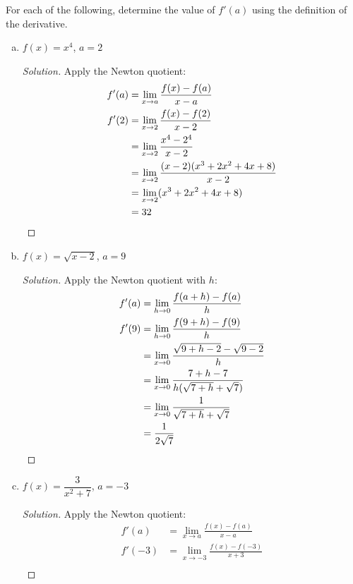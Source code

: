 \documentclass{agony}
\begin{document}
\question For each of the following, determine the value of $f'(a)$ using the definition of the derivative.
\begin{enumerate}[(a)]
  \item $f(x) = x^4$, $a=2$
        \begin{proof}[Solution]
          Apply the Newton quotient:
          \begin{align*}
            f'(a) & = \lim_{x\to a}\frac{f(x)-f(a)}{x-a}            \\
            f'(2) & = \lim_{x\to 2}\frac{f(x)-f(2)}{x-2}            \\
                  & = \lim_{x\to 2}\frac{x^4-2^4}{x-2}              \\
                  & = \lim_{x\to 2}\frac{(x-2)(x^3+2x^2+4x+8)}{x-2} \\
                  & = \lim_{x\to 2}(x^3+2x^2+4x+8)                  \\
                  & = 32 \qedhere
          \end{align*}
        \end{proof}
  \item $f(x) = \sqrt{x-2}$, $a=9$
        \begin{proof}[Solution]
          Apply the Newton quotient with $h$:
          \begin{align*}
            f'(a) & = \lim_{h\to0}\frac{f(a+h)-f(a)}{h}                \\
            f'(9) & = \lim_{h\to0}\frac{f(9+h)-f(9)}{h}                \\
                  & = \lim_{x\to0}\frac{\sqrt{9+h-2}-\sqrt{9-2}}{h}    \\
                  & = \lim_{x\to0}\frac{7+h-7}{h(\sqrt{7+h}+\sqrt{7})} \\
                  & = \lim_{x\to0}\frac{1}{\sqrt{7+h}+\sqrt{7}}        \\
                  & = \frac{1}{2\sqrt{7}} \qedhere
          \end{align*}
        \end{proof}
  \item $f(x) = \dfrac{3}{x^2+7}$, $a=-3$
        \begin{proof}[Solution]
          Apply the Newton quotient:
          \begin{align*}
            f'(a)  & = \lim_{x\to a}\frac{f(x)-f(a)}{x-a}                          \\
            f'(-3) & = \lim_{x\to-3}\frac{f(x)-f(-3)}{x+3}                         \\

\end{align*}
\end{proof}
\end{enumerate}
\end{document}
